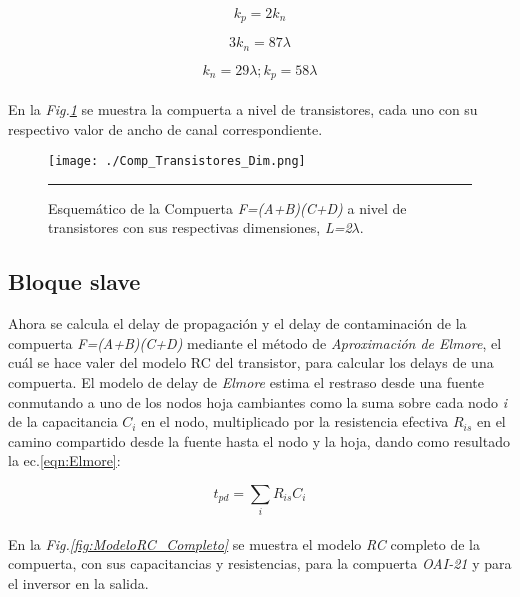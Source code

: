 \documentclass[12pt,a4paper]{article} %
\begin{document}
\begin{equation}\label{eqn:k_Inv3}
k_p=2k_n
\end{equation}

\begin{equation}\label{eqn:k_Inv4}
3k_n=87\lambda
\end{equation}

\begin{equation}\label{eqn:k_Inv5}
k_n=29\lambda ; k_p=58\lambda 
\end{equation}\\

En la \textit{Fig.\ref{fig:Comp_Transistores_Dim}} se muestra la compuerta a nivel de transistores, cada uno con su respectivo valor de ancho de canal correspondiente.\\

\begin{figure}[htbp]
  \centering
    \texttt{[image: ./Comp\_Transistores\_Dim.png]}
    \rule{35em}{0.5pt}
  \caption[Delay]{Esquemático de la Compuerta \textit{F=(A+B)(C+D)} a nivel de transistores con sus respectivas dimensiones, \textit{L=2$\lambda$}.}
  \label{fig:Comp_Transistores_Dim}
\end{figure}

\subsection{Bloque slave}

Ahora se calcula el delay de propagación y el delay de contaminación de la compuerta \textit{F=(A+B)(C+D)} mediante el método de \textit{Aproximación de Elmore}, el cuál se hace valer del modelo RC del transistor, para calcular los delays de una compuerta. El modelo de delay de \textit{Elmore} estima el restraso desde una fuente conmutando a uno de los nodos hoja cambiantes como la suma sobre cada nodo \textit{i} de la capacitancia \textit{$C_{i}$} en el nodo, multiplicado por la resistencia efectiva \textit{$R_{is}$} en el camino compartido desde la fuente hasta el nodo y la hoja, dando como resultado la ec.\ref{eqn:Elmore}:


\begin{equation}\label{eqn:Elmore}
t_{pd} = \sum_{i} R_{is}C_{i}
\end{equation}\\



En la \textit{Fig.\ref{fig:ModeloRC_Completo}} se muestra el modelo \textit{RC} completo de la compuerta, con sus capacitancias y resistencias, para la compuerta \textit{OAI-21} y para el inversor en la salida.\\
\end{document}
